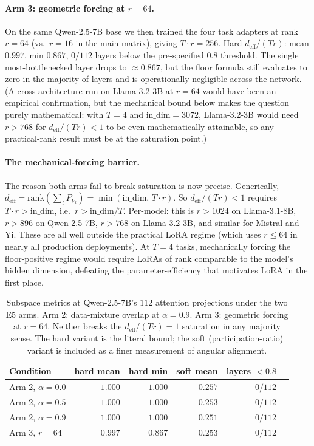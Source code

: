 \paragraph{Arm 3: geometric forcing at $r=64$.}
On the same Qwen-2.5-7B base we then trained the four task
adapters at rank $r = 64$ (vs.\ $r = 16$ in the main matrix),
giving $T \cdot r = 256$. Hard $d_{\mathrm{eff}}/(Tr)$: mean $0.997$,
min $0.867$, $0/112$ layers below the pre-specified $0.8$
threshold. The single most-bottlenecked layer drops to
$\approx 0.867$, but the floor formula still evaluates to zero in
the majority of layers and is operationally negligible across the
network. (A cross-architecture run on
Llama-3.2-3B at $r=64$ would have been an empirical confirmation,
but the mechanical bound below makes the question purely
mathematical: with $T = 4$ and $\mathrm{in\_dim} = 3072$, Llama-3.2-3B
would need $r > 768$ for $d_{\mathrm{eff}}/(Tr) < 1$ to be even
mathematically attainable, so any practical-rank result must be at
the saturation point.)

\paragraph{The mechanical-forcing barrier.}
The reason both arms fail to break saturation is now precise.
Generically, $d_{\mathrm{eff}} = \mathrm{rank}(\sum_t P_{V_t}) =
\min(\mathrm{in\_dim},\, T \cdot r)$. So
$d_{\mathrm{eff}}/(Tr) < 1$ requires $T \cdot r > \mathrm{in\_dim}$,
i.e.\ $r > \mathrm{in\_dim}/T$. Per-model: this is
$r > 1024$ on Llama-3.1-8B, $r > 896$ on Qwen-2.5-7B,
$r > 768$ on Llama-3.2-3B, and similar for Mistral and Yi. These
are all well outside the practical LoRA regime (which uses
$r \leq 64$ in nearly all production deployments). At
$T = 4$ tasks, mechanically forcing the floor-positive regime
would require LoRAs of rank comparable to the model's hidden
dimension, defeating the parameter-efficiency that motivates LoRA
in the first place.

\begin{table}[t]
\centering
\caption{Subspace metrics at Qwen-2.5-7B's $112$ attention
projections under the two E5 arms. Arm 2: data-mixture overlap at
$\alpha = 0.9$. Arm 3: geometric forcing at $r=64$. Neither breaks
the $d_{\mathrm{eff}}/(Tr) = 1$ saturation in any majority sense.
The hard variant is the literal bound; the soft (participation-ratio)
variant is included as a finer measurement of angular alignment.}
\label{tab:e5-null}
\begin{tabular}{lrrrrr}
\hline
Condition & hard mean & hard min & soft mean & layers $< 0.8$ \\
\hline
Arm 2, $\alpha = 0.0$  & $1.000$ & $1.000$ & $0.257$ & $0/112$ \\
Arm 2, $\alpha = 0.5$  & $1.000$ & $1.000$ & $0.253$ & $0/112$ \\
Arm 2, $\alpha = 0.9$  & $1.000$ & $1.000$ & $0.251$ & $0/112$ \\
Arm 3, $r = 64$        & $0.997$ & $0.867$ & $0.253$ & $0/112$ \\
\hline
\end{tabular}
\end{table}

